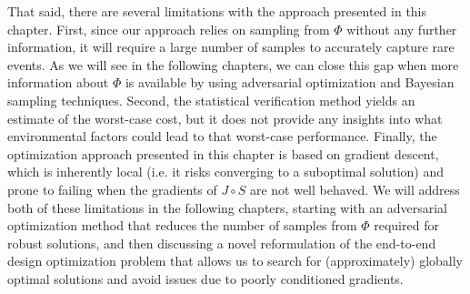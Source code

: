 That said, there are several limitations with the approach presented in this chapter. First, since our approach relies on sampling from $\Phi$ without any further information, it will require a large number of samples to accurately capture rare events. As we will see in the following chapters, we can close this gap when more information about $\Phi$ is available by using adversarial optimization and Bayesian sampling techniques. Second, the statistical verification method yields an estimate of the worst-case cost, but it does not provide any insights into what environmental factors could lead to that worst-case performance. Finally, the optimization approach presented in this chapter is based on gradient descent, which is inherently local (i.e. it risks converging to a suboptimal solution) and prone to failing when the gradients of $J\circ S$ are not well behaved. We will address both of these limitations in the following chapters, starting with an adversarial optimization method that reduces the number of samples from $\Phi$ required for robust solutions, and then discussing a novel reformulation of the end-to-end design optimization problem that allows us to search for (approximately) globally optimal solutions and avoid issues due to poorly conditioned gradients.